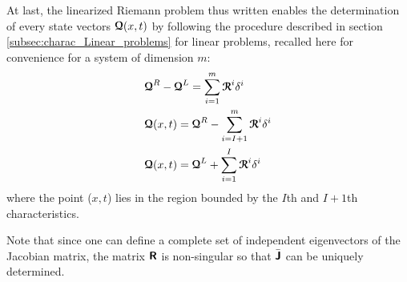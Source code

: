 At last, the linearized Riemann problem thus written enables the determination of every state vectors ${\boldsymbol{\mathcal{Q}}}(x,t)$ by following the procedure described in section \ref{subsec:charac_Linear_problems} for linear problems, recalled here for convenience for a system of dimension $m$:
\begin{equation}
  \label{eq:approx_RS}
  \begin{aligned}
    &  {\boldsymbol{\mathcal{Q}}}^R-{\boldsymbol{\mathcal{Q}}}^L=\sum_{i=1}^{m} {\boldsymbol{\mathcal{R}}}^i\delta^i \\
    &  {\boldsymbol{\mathcal{Q}}}(x,t) ={\boldsymbol{\mathcal{Q}}}^R -\sum_{i=I+1}^{m} {\boldsymbol{\mathcal{R}}}^i\delta^i \\
    &  {\boldsymbol{\mathcal{Q}}}(x,t) ={\boldsymbol{\mathcal{Q}}}^L+ \sum_{i=1}^{I} {\boldsymbol{\mathcal{R}}}^i\delta^i
  \end{aligned}
\end{equation}
where the point ($x,t$) lies in the region bounded by the $I$th and $I+1$th characteristics.

\begin{remark}
  Note that since one can define a complete set of independent eigenvectors of the Jacobian matrix, the matrix $\boldsymbol{\mathsf{R}}$ is non-singular so that $\bar{\boldsymbol{\mathsf{J}}}$ can be uniquely determined.
\end{remark}

